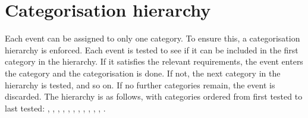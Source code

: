 \section{Categorisation hierarchy}
\label{cat:sec:hierarchy}
Each event can be assigned to only one category. To ensure this, a categorisation hierarchy is enforced. Each event is tested to see if it can be included in the first category in the hierarchy. If it satisfies the relevant requirements, the event enters the category and the categorisation is done. If not, the next category in the hierarchy is tested, and so on. If no further categories remain, the event is discarded. The hierarchy is as follows, with categories ordered from first tested to last tested: \TTHLeptonicTag, \VHTightLeptonicTag, \VHLooseLeptonicTag, \VHMETTag, \TTHHadronicTag, \VHHadronicTag, , , , , , .


